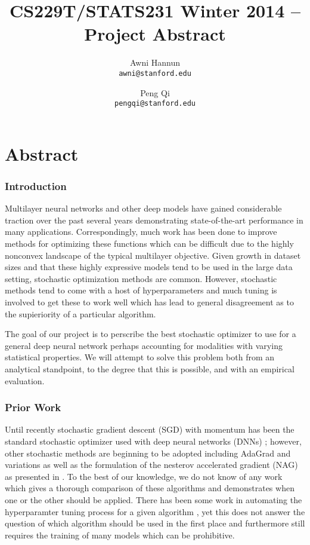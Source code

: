 \documentclass[12pt,english]{article}
\title{
CS229T/STATS231 Winter 2014 -- Project Abstract
}
\author{
Awni Hannun \\
\texttt{awni@stanford.edu}
\and
Peng Qi \\
\texttt{pengqi@stanford.edu}
}
\newcommand{\1}{\mathbb{I}} %
\begin{document}
\maketitle

\section*{Abstract}

\subsubsection*{Introduction}

Multilayer neural networks and other deep models have gained considerable
traction over the past several years demonstrating state-of-the-art performance
in many applications. Correspondingly, much work has been done to improve
methods for optimizing these functions which can be difficult due to the highly
nonconvex landscape of the typical multilayer objective. Given growth in
dataset sizes and that these highly expressive models tend to be used in the
large data setting, stochastic optimization methods are common. However,
stochastic methods tend to come with a host of hyperparameters and much tuning
is involved to get these to work well which has lead to general disagreement as
to the supieriority of a particular algorithm. 

The goal of our project is to perscribe the best stochastic optimizer to use
for a general deep neural network perhaps accounting for modalities with
varying statistical properties. We will attempt to solve this problem both from an 
analytical standpoint, to the degree that this is possible, and with an empirical
evaluation. 

\subsubsection*{Prior Work}\label{prior_work}

Until recently stochastic gradient descent (SGD) with momentum has been the
standard stochastic optimizer used with deep neural networks (DNNs)
\cite{hinton_guide_tr}; however, other stochastic methods are beginning to be
adopted including AdaGrad \cite{duchi_adagrad} and variations as well as the
formulation of the nesterov accelerated gradient (NAG) as presented in
\cite{sutskever_nag}. To the best of our knowledge, we do not know of any work
which gives a thorough comparison of these algorithms and demonstrates when one
or the other should be applied. There has been some work in automating the
hyperparamter tuning process for a given algorithm \cite{snoek_bayes}, yet this
does not answer the question of which algorithm should be used in the first
place and furthermore still requires the training of many models which can be
prohibitive. 
\end{document}
